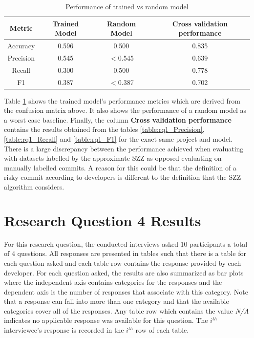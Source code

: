 \documentclass[../main.tex]{subfiles}
\begin{document}
\begin{table}[H]
    \centering
    \caption{Performance of trained vs random model}
    \begin{tabular}{|c|c|c|c|} 
    \hline
    \textbf{Metric} & \textbf{Trained Model} & \textbf{Random Model} & \textbf{Cross validation performance}\\ 
    \hline\hline
     Accuracy & 0.596 & 0.500 & 0.835 \\
     Precision & 0.545 & $<$0.545 & 0.639\\
     Recall & 0.300 & 0.500 & 0.778 \\
     F1 & 0.387 & $<$0.387 & 0.702\\
     \hline
    \end{tabular}
    \label{table:rq3Perf}
\end{table}

Table \ref{table:rq3Perf} shows the trained model's performance metrics which are derived from the confusion matrix above. It also shows the performance of a random model as a worst case baseline. Finally, the column \textbf{Cross validation performance} contains the results obtained from the tables \ref{table:rq1_Precision}, \ref{table:rq1_Recall} and \ref{table:rq1_F1} for the exact same project and model. There is a large discrepancy between the performance achieved when evaluating with datasets labelled by the approximate SZZ as opposed evaluating on manually labelled commits. A reason for this could be that the definition of a risky commit according to developers is different to the definition that the SZZ algorithm considers.

\section{Research Question 4 Results}

For this research question, the conducted interviews asked 10 participants a total of 4 questions. All responses are presented in tables such that there is a table for each question asked and each table row contains the response provided by each developer. For each question asked, the results are also summarized as bar plots where the independent axis contains categories for the responses and the dependent axis is the number of responses that associate with this category. Note that a response can fall into more than one category and that the available categories cover all of the responses. Any table row which contains the value \textit{N/A} indicates no applicable response was available for this question. The $i^{th}$ interviewee's response is recorded in the $i^{th}$ row of each table.
\end{document}
